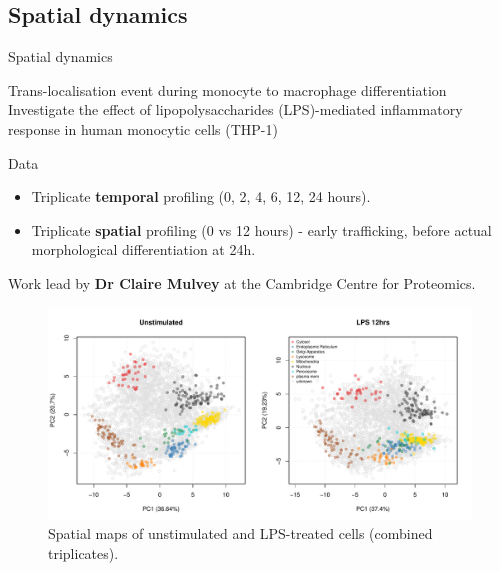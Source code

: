 \subsection{Spatial dynamics}

\begin{frame}{Spatial dynamics}
  \begin{block}{Trans-localisation event during monocyte to macrophage
      differentiation}
    Investigate the effect of lipopolysaccharides (LPS)-mediated
    inflammatory response in human monocytic cells (THP-1)
  \end{block}

  \begin{block}{Data}
    \begin{itemize}
    \item Triplicate \textbf{temporal} profiling (0, 2, 4, 6, 12, 24
      hours).
    \item Triplicate \textbf{spatial} profiling (0 vs 12 hours) -
      early trafficking, before actual morphological differentiation
      at 24h.
    \end{itemize}
  \end{block}

  Work lead by \textbf{Dr Claire Mulvey} at the Cambridge Centre for
  Proteomics.

\end{frame}



\begin{frame}
  \begin{figure}[h]
    \centering
    \includegraphics[width=\linewidth]{./figs_all/lps.pdf}
    \caption{Spatial maps of unstimulated and LPS-treated cells
      (combined triplicates).}
  \end{figure}
\end{frame}

